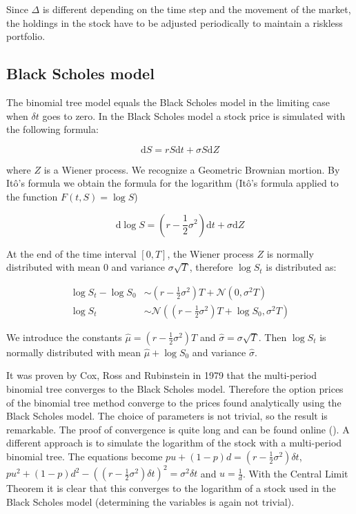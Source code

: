 \documentclass[11pt,a4paper]{article}
\begin{document}
Since $\Delta$ is different depending on the time step and the movement of the market, the holdings in the stock have to be adjusted periodically to maintain a riskless portfolio.

\subsection{Black Scholes model}
The binomial tree model equals the Black Scholes model in the limiting case when $\delta t$ goes to zero. In the Black Scholes model a stock price is simulated with the following formula:

\begin{equation}
\label{eq:bs}
\mathrm{d}S=rS\mathrm{d}t+\sigma S\mathrm{d}Z
\end{equation}

where $Z$ is a Wiener process. We recognize a Geometric Brownian mortion. By It\^o's formula we obtain the formula for the logarithm (It\^o's formula applied to the function $F(t,S)=\log S$)

\begin{equation}
\mathrm{d}\log S=\left(r-\frac{1}{2}\sigma^2\right)\mathrm{d}t+\sigma\mathrm{d}Z
\end{equation}

At the end of the time interval $[0,T]$, the Wiener process $Z$ is normally distributed with mean $0$ and variance $\sigma \sqrt{T}$, therefore $\log S_t$ is distributed as:

\begin{align}
\label{eq:dist}
\log S_t-\log S_0&\sim(r-\frac{1}{2}\sigma^2)T+\mathcal{N}(0,\sigma^2 T)\nonumber \\
\log S_t&\sim\mathcal{N}((r-\frac{1}{2}\sigma^2)T+\log S_0,\sigma^2 T)
\end{align}

We introduce the constants $\hat{\mu}=(r-\frac{1}{2}\sigma^2)T$ and $\hat{\sigma}=\sigma \sqrt{T}$. Then $\log S_t$ is normally distributed with mean $\hat{\mu}+\log S_0$ and variance $\hat{\sigma}$.

It was proven by Cox, Ross and Rubinstein in 1979 that the multi-period binomial tree converges to the Black Scholes model. Therefore the option prices of the binomial tree method converge to the prices found analytically using the Black Scholes model. The choice of parameters is not trivial, so the result is remarkable. The proof of convergence is quite long and can be found online (\cite{stat}). A different approach is to simulate the logarithm of the stock with a multi-period binomial tree. The equations become $pu+(1-p)d=\left(r-\frac{1}{2}\sigma^2\right)\delta t$, $pu^2+(1-p)d^2-\left(\left(r-\frac{1}{2}\sigma^2\right)\delta t\right)^2=\sigma^2\delta t$ and $u=\frac{1}{d}$. With the Central Limit Theorem it is clear that this converges to the logarithm of a stock used in the Black Scholes model (determining the variables is again not trivial).
\end{document}

